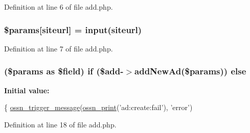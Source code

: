 Definition at line 6 of file add.\+php.

\subsubsection[{\texorpdfstring{\$params}{$params}}]{\setlength{\rightskip}{0pt plus 5cm}\$params\mbox{[}\textquotesingle{}siteurl\textquotesingle{}\mbox{]} = {\bf input}(\textquotesingle{}siteurl\textquotesingle{})}\hypertarget{components_2_ossn_ads_2actions_2add_8php_ad013faa5eae30b9aa01b44779a88194b}{}\label{components_2_ossn_ads_2actions_2add_8php_ad013faa5eae30b9aa01b44779a88194b}


Definition at line 7 of file add.\+php.

\subsubsection[{\texorpdfstring{else}{else}}]{ (\$params as \$field) {\bf if} (\${\bf add}-\/$>$add\+New\+Ad(\$params)) else}\hypertarget{components_2_ossn_ads_2actions_2add_8php_af2728a4fd6840cd6df9e2751bc15f9d2}{}\label{components_2_ossn_ads_2actions_2add_8php_af2728a4fd6840cd6df9e2751bc15f9d2}
{\bfseries Initial value\+:}
\begin{DoxyCode}
\{
    \hyperlink{ossn_8lib_8system_8php_ab3f23f23f32f50c12e7aea0ffaccaac7}{ossn\_trigger\_message}(\hyperlink{ossn_8lib_8languages_8php_a2be5d1c4b695593a9b9067b96df2150a}{ossn\_print}(\textcolor{stringliteral}{'ad:create:fail'}), \textcolor{stringliteral}{'error'})
\end{DoxyCode}


Definition at line 18 of file add.\+php.

